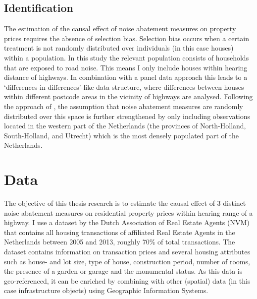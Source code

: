 \documentclass[12pt,a4paper]{scrartcl}
\begin{document}
		\subsection{Identification}
		The estimation of the causal effect of noise abatement measures on property prices requires the absence of selection bias. Selection bias occurs when a certain treatment is not randomly distributed over individuals (in this case houses) within a population. In this study the relevant population consists of households that are exposed to road noise. This means I only include houses within hearing distance of highways. In combination with a panel data approach this leads to a `differences-in-differences'-like data structure, where differences between houses within different postcode areas in the vicinity of highways are analysed. Following the approach of \cite{Theebe2004}, the assumption that noise abatement measures are randomly distributed over this space is further strengthened by only including observations located in the western part of the Netherlands (the provinces of North-Holland, South-Holland, and Utrecht) which is the most densely populated part of the Netherlands.
		
	\section{Data}
	\label{sec:data}	
	The objective of this thesis research is to estimate the causal effect of 3 distinct noise abatement measures on residential property prices within hearing range of a highway. I use a dataset by the Dutch Association of Real Estate Agents (NVM) that contains all housing transactions of affiliated Real Estate Agents in the Netherlands between 2005 and 2013, roughly 70\% of total transactions. The dataset contains information on transaction prices and several housing attributes such as house- and lot size, type of house, construction period, number of rooms, the presence of a garden or garage and the monumental status. As this data is geo-referenced, it can be enriched by combining with other (spatial) data (in this case infrastructure objects) using Geographic Information Systems.
	
\end{document}
